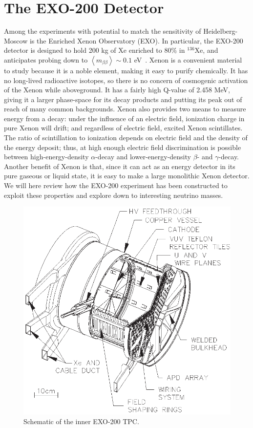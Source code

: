 \renewcommand{\thechapter}{2}
\chapter{The EXO-200 Detector}

Among the experiments with potential to match the sensitivity of Heidelberg-Moscow is the Enriched Xenon Observatory (EXO).  In particular, the EXO-200 detector is designed to hold 200 kg of Xe enriched to 80\% in $^{136}$Xe, and anticipates probing down to $\left< m_{\beta\beta} \right> \sim 0.1$ eV~\cite{CarterICHEP}.  Xenon is a convenient material to study because it is a noble element, making it easy to purify chemically.  It has no long-lived radioactive isotopes, so there is no concern of cosmogenic activation of the Xenon while aboveground.  It has a fairly high Q-value of 2.458 MeV, giving it a larger phase-space for its decay products and putting its peak out of reach of many common backgrounds.  Xenon also provides two means to measure energy from a decay:  under the influence of an electric field, ionization charge in pure Xenon will drift; and regardless of electric field, excited Xenon scintillates.  The ratio of scintillation to ionization depends on electric field and the density of the energy deposit; thus, at high enough electric field discrimination is possible between high-energy-density $\alpha$-decay and lower-energy-density $\beta$- and $\gamma$-decay.  Another benefit of Xenon is that, since it can act as an energy detector in its pure gaseous or liquid state, it is easy to make a large monolithic Xenon detector.  We will here review how the EXO-200 experiment has been constructed to exploit these properties and explore down to interesting neutrino masses.

\begin{figure}
\includegraphics[scale=0.85]{TPCSchematic.eps}
\caption{Schematic of the inner EXO-200 TPC.}
\label{fig:TPCSchematic}
\end{figure}

